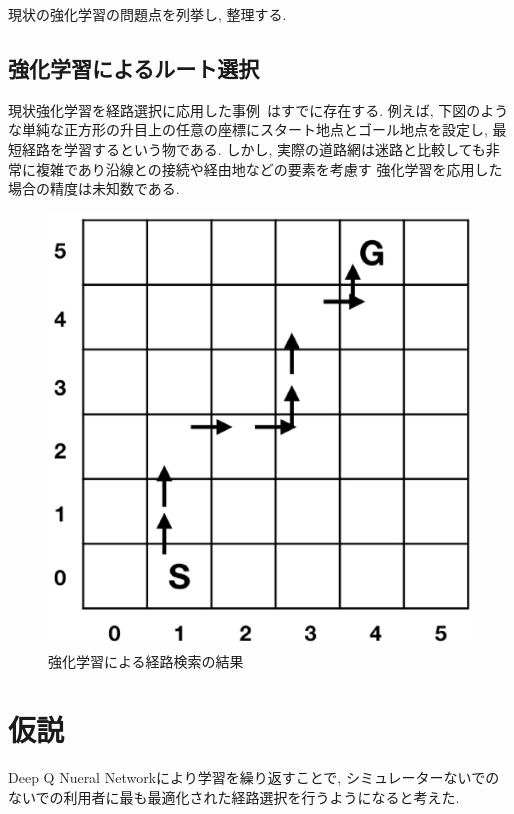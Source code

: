 現状の強化学習の問題点を列挙し, 整理する.

\subsection{強化学習によるルート選択}

現状強化学習を経路選択に応用した事例~\cite{DQNRouteSimple}はすでに存在する. 例えば, 下図のような単純な正方形の升目上の任意の座標にスタート地点とゴール地点を設定し, 最短経路を学習するという物である. 
しかし, 実際の道路網は迷路と比較しても非常に複雑であり沿線との接続や経由地などの要素を考慮す
強化学習を応用した場合の精度は未知数である.



\begin{figure}[H]
    \centering  %
    \includegraphics[clip,width = 13.0cm]{assets/rein_simple.eps}
    \caption{強化学習による経路検索の結果}  \label{sample}
\end{figure}
  





\section{仮説}

Deep Q Nueral Networkにより学習を繰り返すことで, シミュレーターないでのないでの利用者に最も最適化された経路選択を行うようになると考えた.


